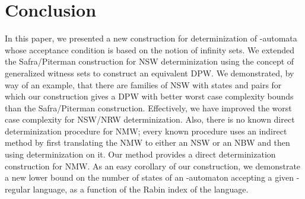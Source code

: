\documentclass[3p]{elsarticle}
\begin{document}
\section{Conclusion}

In this paper, we presented a new construction for determinization
of -automata whose acceptance condition is based on the notion
of infinity sets. We extended the Safra/Piterman construction for NSW
determinization using the concept of generalized witness sets to
construct an equivalent DPW.  We demonstrated, by way of an example,
that there are families of NSW with  states and  pairs for
which our construction gives a DPW with better worst case complexity
bounds than the Safra/Piterman construction.  Effectively, we have
improved the worst case complexity for NSW/NRW determinization.  Also,
there is no known direct determinization procedure for NMW; every
known procedure uses an indirect method by first translating the NMW
to either an NSW or an NBW and then using determinization on it. Our
method provides a direct determinization construction for NMW. As an
easy corollary of our construction, we demonstrate a new lower bound
on the number of states of an -automaton accepting a given
-regular language, as a function of the Rabin index of the
language.

















\end{document}
